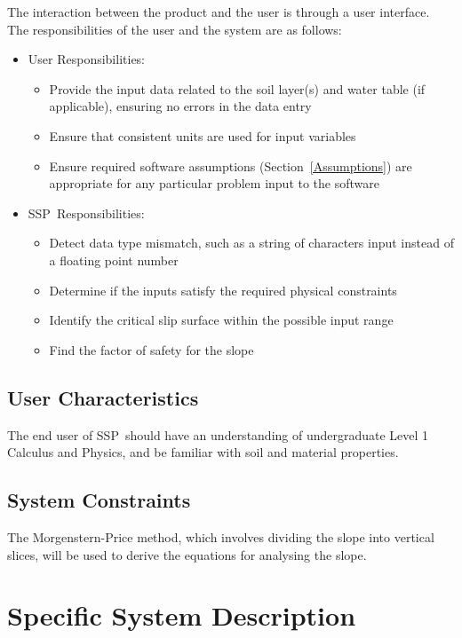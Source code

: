 \documentclass[12pt]{article}
\newcommand{\progname}{SSP}
\begin{document}
The interaction between the product and the user is through a user
interface.  The responsibilities of the user and the system are as follows:

\begin{itemize}
\item User Responsibilities:
  \begin{itemize}
  \item Provide the input data related to the soil layer(s) and water table (if 
  applicable),
    ensuring no errors in the data entry
  \item Ensure that consistent units are used for input variables
  \item Ensure required software assumptions (Section~\ref{Assumptions}) are
    appropriate for any particular problem input to the software
  \end{itemize}
\item \progname\ Responsibilities:
  \begin{itemize}
  \item Detect data type mismatch, such as a string of characters input instead
    of a floating point number
  \item Determine if the inputs satisfy the required physical
    constraints
  \item Identify the critical slip surface within the possible input range
  \item Find the factor of safety for the slope
  \end{itemize}
\end{itemize}

\subsection{User Characteristics}
\label{Sec:UserChar}
The end user of \progname\ should have an understanding of undergraduate
Level 1 Calculus and Physics, and be familiar with soil and material
properties.

\subsection{System Constraints}

The Morgenstern-Price method, which involves dividing the slope into vertical 
slices, will be used to derive the equations for analysing the slope. 

\section{Specific System Description}
\end{document}
